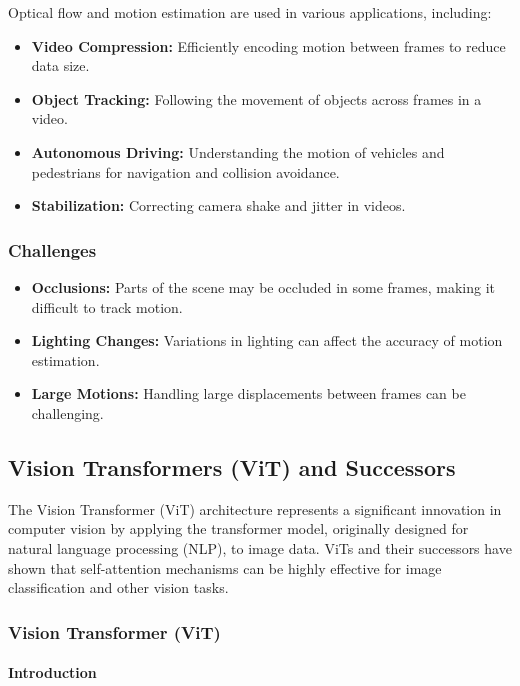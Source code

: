 \documentclass[12pt]{article}
\begin{document}
Optical flow and motion estimation are used in various applications, including:

\begin{itemize}
    \item \textbf{Video Compression:} Efficiently encoding motion between frames to reduce data size.
    \item \textbf{Object Tracking:} Following the movement of objects across frames in a video.
    \item \textbf{Autonomous Driving:} Understanding the motion of vehicles and pedestrians for navigation and collision avoidance.
    \item \textbf{Stabilization:} Correcting camera shake and jitter in videos.
\end{itemize}

\subsubsection{Challenges}

\begin{itemize}
    \item \textbf{Occlusions:} Parts of the scene may be occluded in some frames, making it difficult to track motion.
    \item \textbf{Lighting Changes:} Variations in lighting can affect the accuracy of motion estimation.
    \item \textbf{Large Motions:} Handling large displacements between frames can be challenging.
\end{itemize}

\subsection{Vision Transformers (ViT) and Successors}

The Vision Transformer (ViT) architecture represents a significant innovation in computer vision by applying the transformer model, originally designed for natural language processing (NLP), to image data. ViTs and their successors have shown that self-attention mechanisms can be highly effective for image classification and other vision tasks.

\subsubsection{Vision Transformer (ViT)}

\paragraph{Introduction}
\end{document}
